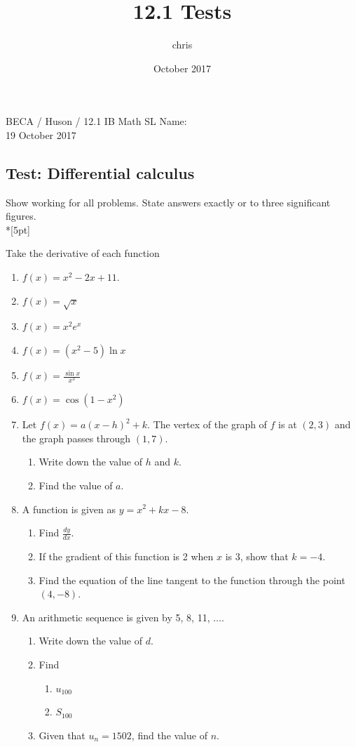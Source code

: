 \documentclass{article}
\title{12.1 Tests}
\author{chris }
\date{October 2017}
\begin{document}
\noindent BECA / Huson / 12.1 IB Math SL \qquad \qquad Name:\\
19 October 2017
\subsection*{Test: Differential calculus}
Show working for all problems. State answers exactly or to three significant figures.\\*[5pt]

Take the derivative of each function

\begin{enumerate}

\item $f(x) = x^2 - 2x + 11$.
\item $f(x)=\sqrt{x}$
\item $f(x)=x^2 e^x$
\item $f(x)=(x^2-5)\ln{x}$
\item $\displaystyle f(x)=\frac{\sin{x}}{x^3}$
\item $f(x)=\cos{(1-x^2)}$

\item Let $f(x)=a(x-h)^2+k$. The vertex of the graph of $f$ is at $(2,3)$ and the graph passes through $(1,7)$.
\begin{enumerate}
    \item Write down the value of $h$ and $k$.
    \item Find the value of $a$.
\end{enumerate}

\item A function is given as $y = x^2 + kx -8$.
\begin{enumerate}
    \item Find $\displaystyle \frac {dy}{dx}$.
	\item If the gradient of this function is 2 when $x$ is 3, show that $k=-4$.
	\item Find the equation of the line tangent to the function through the point $(4, -8)$.
\end{enumerate}

\item An arithmetic sequence is given by 5, 8, 11, $\ldots$.
\begin{enumerate}
    \item Write down the value of $d$.
	\item Find
	\begin{enumerate}
	    \item $u_{100}$
	    \item $S_{100}$
	\end{enumerate}
	\item Given that $u_n = 1502$, find the value of $n$.
\end{enumerate}


\end{enumerate}
\end{document}
